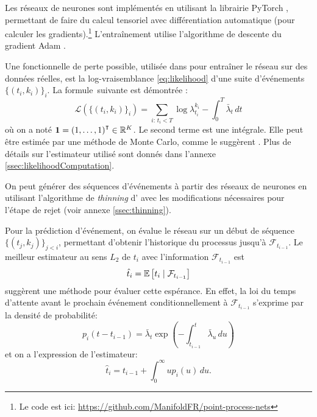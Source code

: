 \documentclass[../main.tex]{subfiles}
\begin{document}
	
Les réseaux de neurones sont implémentés en utilisant la librairie \textsf{PyTorch} \cite{paszke2017automatic}, permettant de faire du calcul tensoriel avec différentiation automatique (pour calculer les gradients).\footnote{Le code est ici: \url{https://github.com/ManifoldFR/point-process-nets}} L'entraînement utilise l'algorithme de descente du gradient Adam \autocite{AdamKingmaB14}.

Une fonctionnelle de perte possible, utilisée dans \autocite{meiEisnerNeuralHawkes} pour entraîner le réseau sur des données réelles, est la log-vraisemblance \eqref{eq:likelihood} d'une suite d'événements $\{(t_i,k_i)\}_i$. La formule\footnotemark~suivante est démontrée \cite[15]{meiEisnerNeuralHawkes}: 
\begin{equation}\label{eq:explicitLikelihood}
\mathcal{L}\left(\{(t_i,k_i)\}_i\right)
=
\sum_{i:\, t_i < T} \log\lambda^{k_i}_{t_i} - \int_0^T \bar\lambda_t\,dt
\end{equation}
où on a noté $\mathbf{1} = {(1,\ldots,1)}^\intercal\in\mathbb{R}^K$. Le second terme est une intégrale. Elle peut être estimée par une méthode de Monte Carlo, comme le suggèrent \citeauthor{meiEisnerNeuralHawkes}. Plus de détails sur l'estimateur utilisé sont donnés dans l'annexe \ref{ssec:likelihoodComputation}.


On peut générer des séquences d'événements à partir des réseaux de neurones en utilisant l'algorithme de \textit{thinning} d'\citeauthor{ogata1981} \autocite{ogata1981} avec les modifications nécessaires pour l'étape de rejet (voir annexe \ref{ssec:thinning}).

Pour la prédiction d'événement, on évalue le réseau sur un début de séquence $\{(t_j,k_j)\}_{j < i}$, permettant d'obtenir l'historique du processus jusqu'à $\mathcal{F}_{t_{i-1}}$. Le meilleur estimateur au sens $L_2$ de $t_i$ avec l'information $\mathcal{F}_{t_{i-1}}$ est
\[
	\hat{t}_i = \mathbb{E}\left[ t_i \mid \mathcal{F}_{t_{i-1}} \right]
\]
\citeauthor{meiEisnerNeuralHawkes} suggèrent une méthode pour évaluer cette espérance. En effet, la loi du temps d'attente avant le prochain événement conditionnellement à $\mathcal{F}_{t_{i-1}}$ s'exprime par la densité de probabilité:
\begin{equation}\label{eq:nextIncrementDensity}
	p_i(t-t_{i-1}) = \bar\lambda_t\exp\left(-\int_{t_{i-1}}^t\bar\lambda_u\,du\right)
\end{equation}
et on a l'expression de l'estimateur:
\begin{equation}\label{eq:nextEventTimeEstimator}
	\hat{t}_i = t_{i-1} + \int_0^\infty u p_i(u)\,du.
\end{equation}
\end{document}
